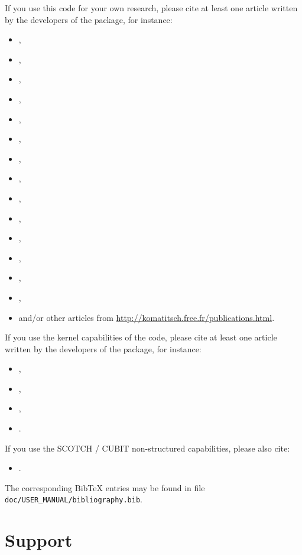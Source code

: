 \documentclass[oneside,english,onecolumn,letterpaper]{book}
\begin{document}
If you use this code for your own research, please cite at least one article
written by the developers of the package, for instance:
%
\begin{itemize}
\item \cite{TrKoLi08},
\item \cite{PeKoLuMaLeCaLeMaLiBlNiBaTr11},
\item \cite{VaCaSaKoVi99},
\item \cite{LeChKoHuTr09},
\item \cite{LeChLiKoHuTr08},
\item \cite{LeKoHuTr09},
\item \cite{KoErGoMi10},
\item \cite{KoMiEr09},
\item \cite{LiPoKoTr04},
\item \cite{ChKoViCaVaFe07},
\item \cite{KoVi98},
\item \cite{KoTr99},
\item \cite{KoLiTrSuStSh04},
\item \cite{MoTr08},
\item and/or other articles from \url{http://komatitsch.free.fr/publications.html}.
\end{itemize}
%
If you use the kernel capabilities of the code, please cite at least one article
written by the developers of the package, for instance:
%
\begin{itemize}
\item \cite{TrKoLi08},
\item \cite{PeKoLuMaLeCaLeMaLiBlNiBaTr11},
\item \cite{LiTr06},
\item \cite{MoLuTr09}.
\end{itemize}
%
If you use the SCOTCH / CUBIT non-structured capabilities, please also cite:
%
\begin{itemize}
\item \cite{MaKoBlLe08}.
\end{itemize}
%
The corresponding Bib\TeX{} entries may be found
in file \texttt{doc/USER\_MANUAL/bibliography.bib}.



\section{Support}
\end{document}
